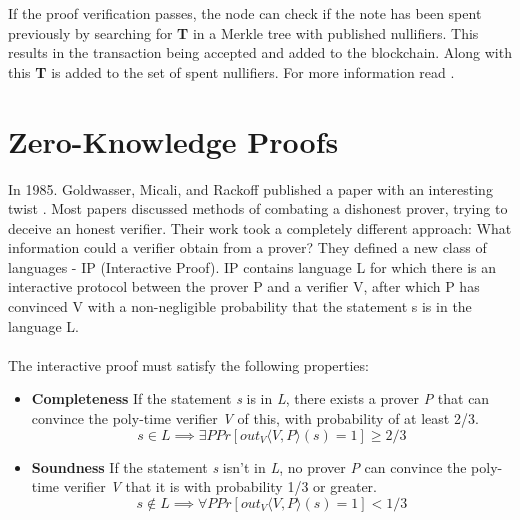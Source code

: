 If the proof verification passes, the node can check if the note has been spent previously by searching for \textbf{T} in a Merkle tree with published nullifiers. This results in the transaction being accepted and added to the blockchain. Along with this \textbf{T} is added to the set of spent nullifiers. For more information read \cite{zcashzksnarks, zcashprotocol, sasson2014zerocash}.


\section{Zero-Knowledge Proofs}
\label{section:zkproofs}
In 1985. Goldwasser, Micali, and Rackoff published a paper with an interesting twist \cite{goldwasser1985knowledge}. Most papers discussed methods of combating a dishonest prover, trying to deceive an honest verifier. Their work took a completely different approach: What information could a verifier obtain from a prover? They defined a new class of languages - IP (Interactive Proof). IP contains language L for which there is an interactive protocol between the prover P and a verifier V, after which P has convinced V with a non-negligible probability that the statement s is in the language L.\\
\\
The interactive proof must satisfy the following properties:
\begin{itemize}
    \item \textbf{Completeness} If the statement \textit{s} is in \textit{L}, there exists a prover \textit{P} that can convince the poly-time verifier \textit{V} of this, with probability of at least 2/3.
    $$ s \in L \implies \exists P Pr[out_V \langle V, P \rangle (s) = 1 ] \geq 2/3 $$
    \item \textbf{Soundness} If the statement \textit{s} isn't in \textit{L}, no prover \textit{P} can convince the poly-time verifier \textit{V} that it is with probability 1/3 or greater.
    $$ s \notin L \implies \forall P Pr[out_V \langle V, P \rangle (s) = 1 ] < 1/3 $$
\end{itemize}

